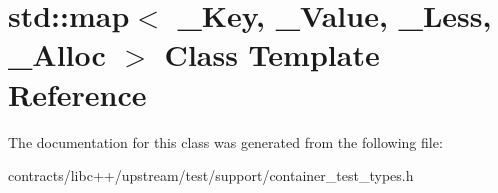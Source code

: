 \hypertarget{classstd_1_1map}{}\section{std\+:\+:map$<$ \+\_\+\+Key, \+\_\+\+Value, \+\_\+\+Less, \+\_\+\+Alloc $>$ Class Template Reference}
\label{classstd_1_1map}


The documentation for this class was generated from the following file\+:\begin{DoxyCompactItemize}
\item 
contracts/libc++/upstream/test/support/container\+\_\+test\+\_\+types.\+h\end{DoxyCompactItemize}
